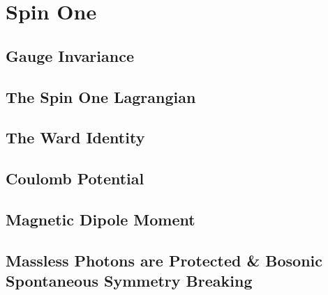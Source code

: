 \chapter{Spin One}
\label{chap:spin-one}

\section{Gauge Invariance}

\section{The Spin One Lagrangian}

\section{The Ward Identity}

\section{Coulomb Potential}

\section{Magnetic Dipole Moment}

\section{Massless Photons are Protected \& Bosonic Spontaneous Symmetry Breaking}